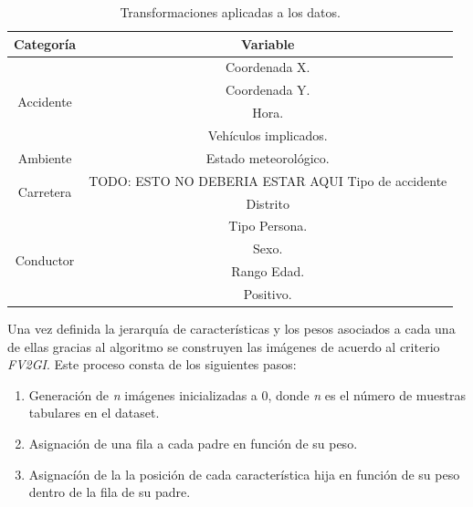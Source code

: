         \begin{table}[H]
          \centering
          \begin{tabular}{ |c|c| }
               \hline
               \textbf{Categoría} & \textbf{Variable}\\

               \hline
               \multirow{4}{*}{Accidente}            & Coordenada X.\\
                                                     & Coordenada Y.\\
                                                     & Hora.\\
                                                     & Vehículos implicados.\\

               \hline
               \multirow{1}{*}{Ambiente}             & Estado meteorológico.\\

               \hline
               \multirow{2}{*}{Carretera}            & TODO: ESTO NO DEBERIA ESTAR AQUI Tipo de accidente\\
                                                     & Distrito\\

               \hline
               \multirow{4}{*}{Conductor}            & Tipo Persona.\\
                                                     & Sexo.\\
                                                     & Rango Edad.\\
                                                     & Positivo.\\

               \hline
          \end{tabular}
          \caption{Transformaciones aplicadas a los datos.}
          \label{JerarquiaCaracteristicasTabla}
        \end{table}



        Una vez definida la jerarquía de características y los pesos asociados a cada una de ellas gracias al algoritmo  se construyen las imágenes de acuerdo al criterio \textit{FV2GI}. Este proceso consta de los siguientes pasos:

        \begin{enumerate}

            \item Generación de \textit{n} imágenes inicializadas a 0, donde \textit{n} es el número de muestras tabulares en el dataset.
            \item Asignación de una fila a cada padre en función de su peso.
            \item Asignacíón de la la posición de cada característica hija en función de su peso dentro de la fila de su padre.
        
        \end{enumerate}

